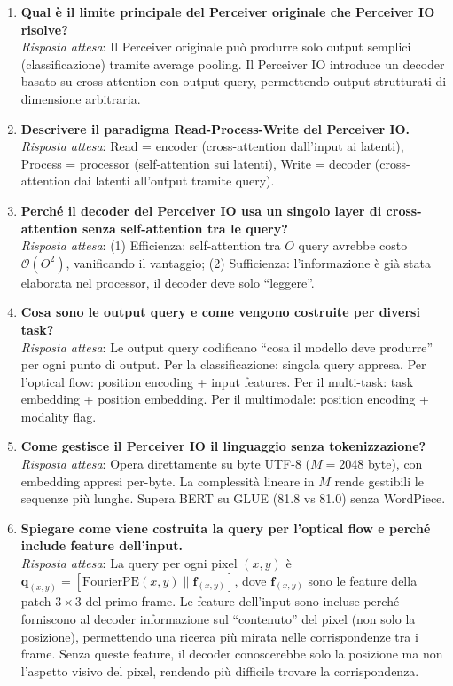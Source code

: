 \documentclass[12pt,a4paper]{article}
\begin{document}
\begin{enumerate}[label=\textbf{Q\arabic*.}]
    \item \textbf{Qual \`e il limite principale del Perceiver originale che Perceiver IO risolve?}\\
    \textit{Risposta attesa}: Il Perceiver originale pu\`o produrre solo output semplici (classificazione) tramite average pooling. Il Perceiver IO introduce un decoder basato su cross-attention con output query, permettendo output strutturati di dimensione arbitraria.

    \item \textbf{Descrivere il paradigma Read-Process-Write del Perceiver IO.}\\
    \textit{Risposta attesa}: Read = encoder (cross-attention dall'input ai latenti), Process = processor (self-attention sui latenti), Write = decoder (cross-attention dai latenti all'output tramite query).

    \item \textbf{Perch\'e il decoder del Perceiver IO usa un singolo layer di cross-attention senza self-attention tra le query?}\\
    \textit{Risposta attesa}: (1) Efficienza: self-attention tra $O$ query avrebbe costo $\mathcal{O}(O^2)$, vanificando il vantaggio; (2) Sufficienza: l'informazione \`e gi\`a stata elaborata nel processor, il decoder deve solo ``leggere''.

    \item \textbf{Cosa sono le output query e come vengono costruite per diversi task?}\\
    \textit{Risposta attesa}: Le output query codificano ``cosa il modello deve produrre'' per ogni punto di output. Per la classificazione: singola query appresa. Per l'optical flow: position encoding + input features. Per il multi-task: task embedding + position embedding. Per il multimodale: position encoding + modality flag.

    \item \textbf{Come gestisce il Perceiver IO il linguaggio senza tokenizzazione?}\\
    \textit{Risposta attesa}: Opera direttamente su byte UTF-8 ($M = 2048$ byte), con embedding appresi per-byte. La complessit\`a lineare in $M$ rende gestibili le sequenze pi\`u lunghe. Supera BERT su GLUE (81.8 vs 81.0) senza WordPiece.

    \item \textbf{Spiegare come viene costruita la query per l'optical flow e perch\'e include feature dell'input.}\\
    \textit{Risposta attesa}: La query per ogni pixel $(x,y)$ \`e $\mathbf{q}_{(x,y)} = [\text{FourierPE}(x,y) \| \mathbf{f}_{(x,y)}]$, dove $\mathbf{f}_{(x,y)}$ sono le feature della patch $3 \times 3$ del primo frame. Le feature dell'input sono incluse perch\'e forniscono al decoder informazione sul ``contenuto'' del pixel (non solo la posizione), permettendo una ricerca pi\`u mirata nelle corrispondenze tra i frame. Senza queste feature, il decoder conoscerebbe solo la posizione ma non l'aspetto visivo del pixel, rendendo pi\`u difficile trovare la corrispondenza.


\end{enumerate}
\end{document}

